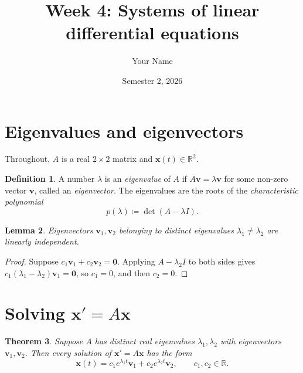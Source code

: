 \documentclass[11pt,a4paper]{article}   %
\title{Week 4: Systems of linear differential equations}
\author{Your Name}
\date{Semester 2, 2026}
\numberwithin{equation}{section}
\numberwithin{figure}{section}
\numberwithin{table}{section}
\theoremstyle{plain}                    %
\newtheorem{theorem}{Theorem}[section]
\newtheorem{lemma}[theorem]{Lemma}
\theoremstyle{definition}               %
\newtheorem{definition}[theorem]{Definition}
\theoremstyle{remark}                   %
\begin{document}
\maketitle

\section{Eigenvalues and eigenvectors}

Throughout, $A$ is a real $2 \times 2$ matrix and $\mathbf{x}(t) \in \mathbb{R}^2$.

\begin{definition}
A number $\lambda$ is an \emph{eigenvalue} of $A$ if $A\mathbf{v} = \lambda\mathbf{v}$ for some
non-zero vector $\mathbf{v}$, called an \emph{eigenvector}. The eigenvalues are the roots of the
\emph{characteristic polynomial}
\begin{equation}\label{eq:char}
  p(\lambda) \coloneqq \det(A - \lambda I).
\end{equation}
\end{definition}

\begin{lemma}\label{lem:independent}
Eigenvectors $\mathbf{v}_1, \mathbf{v}_2$ belonging to distinct eigenvalues $\lambda_1 \neq \lambda_2$
are linearly independent.
\end{lemma}

\begin{proof}
Suppose $c_1\mathbf{v}_1 + c_2\mathbf{v}_2 = \mathbf{0}$. Applying $A - \lambda_2 I$ to both sides
gives $c_1(\lambda_1 - \lambda_2)\mathbf{v}_1 = \mathbf{0}$, so $c_1 = 0$, and then $c_2 = 0$.
\end{proof}

\section{Solving \texorpdfstring{$\mathbf{x}' = A\mathbf{x}$}{x' = Ax}}

\begin{theorem}\label{thm:general}
Suppose $A$ has distinct real eigenvalues $\lambda_1, \lambda_2$ with eigenvectors
$\mathbf{v}_1, \mathbf{v}_2$. Then every solution of $\mathbf{x}' = A\mathbf{x}$ has the form
\begin{equation}\label{eq:general}
  \mathbf{x}(t) = c_1 e^{\lambda_1 t}\mathbf{v}_1 + c_2 e^{\lambda_2 t}\mathbf{v}_2,
  \qquad c_1, c_2 \in \mathbb{R}.
\end{equation}
\end{theorem}
\end{document}
